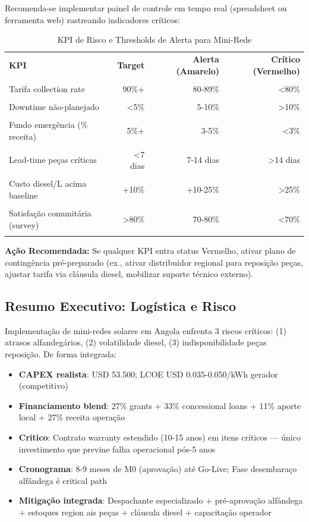 \documentclass[12pt, a4paper]{article}
\begin{document}
Recomenda-se implementar painel de controle em tempo real (spreadsheet ou ferramenta web) rastreando indicadores críticos:\

\begin{table}[H]
\centering
\caption{KPI de Risco e Thresholds de Alerta para Mini-Rede}
\label{tab:kpi}
\small
\begin{tabular}{lrrr}
\toprule\textbf{KPI} &\textbf{Target} &\textbf{Alerta (Amarelo)} &\textbf{Crítico (Vermelho)} \\\\
\midrule
Tarifa collection rate & 90\%+ & 80-89\% & <80\% \\\\
Downtime não-planejado & <5\% & 5-10\% & >10\% \\\\
Fundo emergência (\% receita) & 5\%+ & 3-5\% & <3\% \\\\
Lead-time peças críticas & <7 dias & 7-14 dias & >14 dias \\\\
Custo diesel/L acima baseline & +10\% & +10-25\% & >25\% \\\\
Satisfação comunitária (survey) & >80\% & 70-80\% & <70\% \\\\
\bottomrule
\end{tabular}
\end{table}\textbf{Ação Recomendada:} Se qualquer KPI entra status Vermelho, ativar plano de contingência pré-preparado (ex., ativar distribuidor regional para reposição peças, ajustar tarifa via cláusula diesel, mobilizar suporte técnico externo).

\subsection{Resumo Executivo: Logística e Risco}

Implementação de mini-redes solares em Angola enfrenta 3 riscos críticos: (1) atrasos alfandegários, (2) volatilidade diesel, (3) indisponibilidade peças reposição. De forma integrada:
\begin{itemize}
\item\textbf{CAPEX realista}: USD 53.500; LCOE USD 0.035-0.050/kWh gerador (competitivo)\

\item\textbf{Financiamento blend}: 27\% grants + 33\% concessional loans + 11\% aporte local + 27\% receita operação\

\item\textbf{Critico}: Contrato warranty estendido (10-15 anos) em itens críticos — único investimento que previne falha operacional pós-5 anos\

\item\textbf{Cronograma}: 8-9 meses de M0 (aprovação) até Go-Live; Fase desembaraço alfândega é critical path\

\item\textbf{Mitigação integrada}: Despachante especializado + pré-aprovação alfândega + estoques region ais peças + cláusula diesel + capacitação operador\
\end{itemize}
\end{document}
